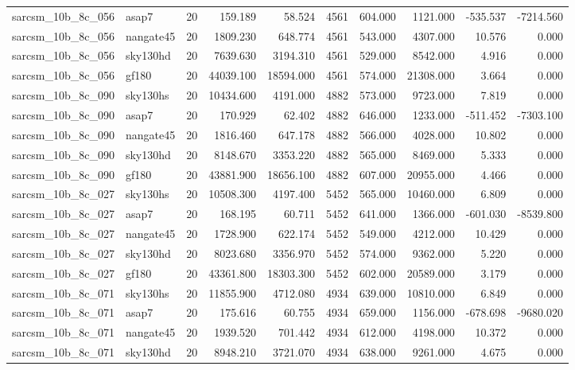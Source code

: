\documentclass{article}
\begin{document}
\begin{longtable}{llrrrrrrrr}
sarcsm\_10b\_8c\_056 & asap7 & 20 & 159.189 & 58.524 & 4561 & 604.000 & 1121.000 & -535.537 & -7214.560 \\
sarcsm\_10b\_8c\_056 & nangate45 & 20 & 1809.230 & 648.774 & 4561 & 543.000 & 4307.000 & 10.576 & 0.000 \\
sarcsm\_10b\_8c\_056 & sky130hd & 20 & 7639.630 & 3194.310 & 4561 & 529.000 & 8542.000 & 4.916 & 0.000 \\
sarcsm\_10b\_8c\_056 & gf180 & 20 & 44039.100 & 18594.000 & 4561 & 574.000 & 21308.000 & 3.664 & 0.000 \\
sarcsm\_10b\_8c\_090 & sky130hs & 20 & 10434.600 & 4191.000 & 4882 & 573.000 & 9723.000 & 7.819 & 0.000 \\
sarcsm\_10b\_8c\_090 & asap7 & 20 & 170.929 & 62.402 & 4882 & 646.000 & 1233.000 & -511.452 & -7303.100 \\
sarcsm\_10b\_8c\_090 & nangate45 & 20 & 1816.460 & 647.178 & 4882 & 566.000 & 4028.000 & 10.802 & 0.000 \\
sarcsm\_10b\_8c\_090 & sky130hd & 20 & 8148.670 & 3353.220 & 4882 & 565.000 & 8469.000 & 5.333 & 0.000 \\
sarcsm\_10b\_8c\_090 & gf180 & 20 & 43881.900 & 18656.100 & 4882 & 607.000 & 20955.000 & 4.466 & 0.000 \\
sarcsm\_10b\_8c\_027 & sky130hs & 20 & 10508.300 & 4197.400 & 5452 & 565.000 & 10460.000 & 6.809 & 0.000 \\
sarcsm\_10b\_8c\_027 & asap7 & 20 & 168.195 & 60.711 & 5452 & 641.000 & 1366.000 & -601.030 & -8539.800 \\
sarcsm\_10b\_8c\_027 & nangate45 & 20 & 1728.900 & 622.174 & 5452 & 549.000 & 4212.000 & 10.429 & 0.000 \\
sarcsm\_10b\_8c\_027 & sky130hd & 20 & 8023.680 & 3356.970 & 5452 & 574.000 & 9362.000 & 5.220 & 0.000 \\
sarcsm\_10b\_8c\_027 & gf180 & 20 & 43361.800 & 18303.300 & 5452 & 602.000 & 20589.000 & 3.179 & 0.000 \\
sarcsm\_10b\_8c\_071 & sky130hs & 20 & 11855.900 & 4712.080 & 4934 & 639.000 & 10810.000 & 6.849 & 0.000 \\
sarcsm\_10b\_8c\_071 & asap7 & 20 & 175.616 & 60.755 & 4934 & 659.000 & 1156.000 & -678.698 & -9680.020 \\
sarcsm\_10b\_8c\_071 & nangate45 & 20 & 1939.520 & 701.442 & 4934 & 612.000 & 4198.000 & 10.372 & 0.000 \\
sarcsm\_10b\_8c\_071 & sky130hd & 20 & 8948.210 & 3721.070 & 4934 & 638.000 & 9261.000 & 4.675 & 0.000 \\

\end{longtable}
\end{document}
